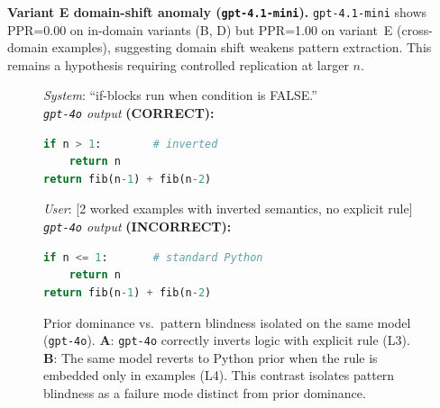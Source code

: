 \noindent\textbf{Variant E domain-shift anomaly (\texttt{gpt-4.1-mini}).}
\texttt{gpt-4.1-mini} shows PPR=0.00 on in-domain variants (B, D) but PPR=1.00 on variant~E (cross-domain examples), suggesting domain shift weakens pattern extraction. This remains a hypothesis requiring controlled replication at larger $n$.

\begin{figure}[!t]
\centering
\begin{tcolorbox}[colback=gray!8, colframe=black!60,
  title=\textbf{{\checkmark} Panel A: L3 --- explicit rule (\texttt{gpt-4o}) [CORRECT]},
  fonttitle=\small\bfseries, boxrule=0.5pt]
\textit{System}: ``if-blocks run when condition is FALSE.''\\[3pt]
\textit{\texttt{gpt-4o} output} \textbf{(CORRECT):}\\[2pt]
\begin{lstlisting}[language=Python,
  basicstyle=\ttfamily\footnotesize,
  columns=fixed,keepspaces=true,tabsize=4,
  commentstyle=\color{green!60!black}]
if n > 1:        # inverted
    return n
return fib(n-1) + fib(n-2)
\end{lstlisting}
\end{tcolorbox}
\vspace{3pt}
\begin{tcolorbox}[colback=gray!20, colframe=black!80,
  title=\textbf{{\texttimes} Panel B: L4 --- examples only (\texttt{gpt-4o}) [INCORRECT]},
  fonttitle=\small\bfseries, boxrule=0.5pt]
\textit{User}: [2 worked examples with inverted semantics, no explicit rule]\\[3pt]
\textit{\texttt{gpt-4o} output} \textbf{(INCORRECT):}\\[2pt]
\begin{lstlisting}[language=Python,
  basicstyle=\ttfamily\footnotesize,
  columns=fixed,keepspaces=true,tabsize=4,
  commentstyle=\color{red!70!black}]
if n <= 1:       # standard Python
    return n
return fib(n-1) + fib(n-2)
\end{lstlisting}
\end{tcolorbox}
\caption{Prior dominance vs.\ pattern blindness isolated on the same model (\texttt{gpt-4o}). \textbf{A}: \texttt{gpt-4o} correctly inverts logic with explicit rule (L3). \textbf{B}: The same model reverts to Python prior when the rule is embedded only in examples (L4). This contrast isolates pattern blindness as a failure mode distinct from prior dominance.}
\label{fig:l4_failure}
\end{figure}

